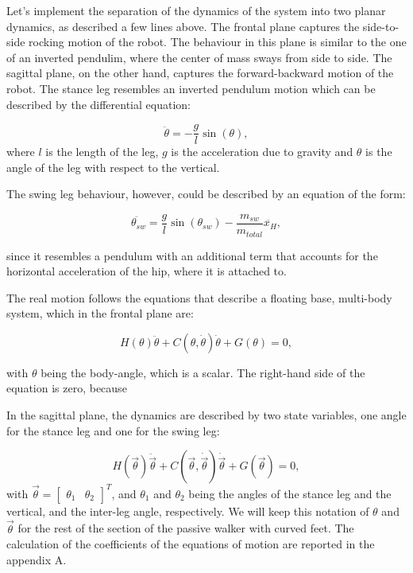 Let's implement the separation of the dynamics of the system into two planar dynamics, as described a few lines above.
The frontal plane captures the side-to-side rocking motion of the robot. The behaviour in this plane is similar to the one of an inverted pendulim, where the center of mass sways from side to side.
The sagittal plane, on the other hand, captures the forward-backward motion of the robot.
The stance leg resembles an inverted pendulum motion which can be described by the differential equation:

\[
\ddot{\theta} = -\frac{g}{l}\sin(\theta),
\]
where $l$ is the length of the leg, $g$ is the acceleration due to gravity and $\theta$ is the angle of the leg with respect to the vertical.

The swing leg behaviour, however, could be described by an equation of the form:

\[
\ddot{\theta_{sw}} = \frac{g}{l}\sin(\theta_{sw}) - \frac{m_{sw}}{m_{total}}\ddot{x_H},
\]

since it resembles a pendulum with an additional term that accounts for the horizontal acceleration of the hip, where it is attached to.

The real motion follows the equations that describe a floating base, multi-body system, which in the frontal plane are:

\begin{equation}\label{eq:frontal_plane_eom}
    H(\theta)\ddot{\theta} + C(\theta, \dot{\theta})\dot{\theta} + G(\theta) = 0,
\end{equation}

with $\theta$ being the body-angle, which is a scalar.
The right-hand side of the equation is zero, because %

In the sagittal plane, the dynamics are described by two state variables, one angle for the stance leg and one for the swing leg:

\begin{equation}\label{eq:sagittal_plane_eom}
    H(\vec{\theta})\ddot{\vec{\theta}} + C(\vec{\theta}, \dot{\vec{\theta}})\dot{\vec{\theta}} + G(\vec{\theta}) = 0,
\end{equation}
with $\vec{\theta} = \begin{bmatrix}
    \theta_1 & \theta_2
\end{bmatrix}^T$,
and $\theta_1$ and $\theta_2$ being the angles of the stance leg and the vertical, and the inter-leg angle, respectively.
We will keep this notation of $\theta$ and $\vec{\theta}$ for the rest of the section of the passive walker with curved feet.
The calculation of the coefficients of the equations of motion are reported in the appendix A. %

